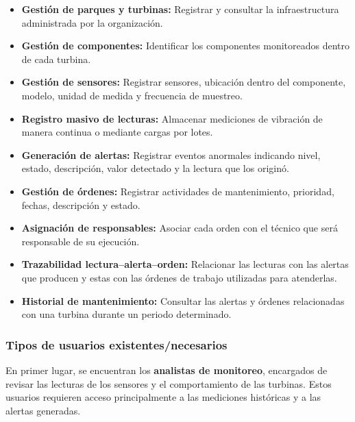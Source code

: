 \documentclass[11pt,a4paper]{article}
\begin{document}
\begin{itemize}
    \item \textbf{Gestión de parques y turbinas:} Registrar y consultar la
    infraestructura administrada por la organización.

    \item \textbf{Gestión de componentes:} Identificar los componentes monitoreados
    dentro de cada turbina.

    \item \textbf{Gestión de sensores:} Registrar sensores, ubicación dentro del
    componente, modelo, unidad de medida y frecuencia de muestreo.

    \item \textbf{Registro masivo de lecturas:} Almacenar mediciones de vibración de
    manera continua o mediante cargas por lotes.

    \item \textbf{Generación de alertas:} Registrar eventos anormales indicando nivel,
    estado, descripción, valor detectado y la lectura que los originó.

    \item \textbf{Gestión de órdenes:} Registrar actividades de mantenimiento,
    prioridad, fechas, descripción y estado.

    \item \textbf{Asignación de responsables:} Asociar cada orden con el técnico que
    será responsable de su ejecución.

    \item \textbf{Trazabilidad lectura--alerta--orden:} Relacionar las lecturas con las
    alertas que producen y estas con las órdenes de trabajo utilizadas para atenderlas.

    \item \textbf{Historial de mantenimiento:} Consultar las alertas y órdenes
    relacionadas con una turbina durante un periodo determinado.
\end{itemize}

\subsubsection{Tipos de usuarios existentes/necesarios}

En primer lugar, se encuentran los \textbf{analistas de monitoreo}, encargados de
revisar las lecturas de los sensores y el comportamiento de las turbinas. Estos
usuarios requieren acceso principalmente a las mediciones históricas y a las alertas
generadas.
\end{document}
